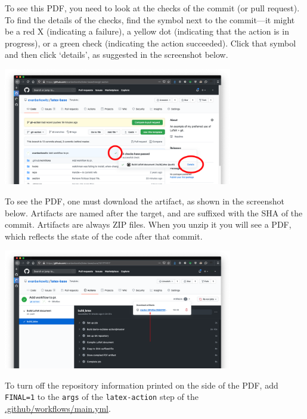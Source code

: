 To see this PDF, you need to look at the checks of the commit (or pull request).
To find the details of the checks, find the symbol next to the commit---it might be a red X (indicating a failure), a yellow dot (indicating that the action is in progress), or a green check (indicating the action succeeded).
Click that symbol and then click `details', as suggested in the screenshot below.
\begin{center}
\includegraphics[width=0.75\textwidth]{figure/github-action-find-details}
\end{center}
To see the PDF, one must download the artifact, as shown in the screenshot below.
Artifacts are named after the target, and are suffixed with the SHA of the commit.
Artifacts are always ZIP files.  When you unzip it you will see a PDF, which reflects the state of the code after that commit.
\begin{center}
\includegraphics[width=0.75\textwidth]{figure/github-action-artifact}
\end{center}
To turn off the repository information printed on the side of the PDF, add \texttt{FINAL=1} to the \texttt{args} of the \texttt{latex-action} step of the \href{https://github.com/evanberkowitz/latex-base/blob/gh-action/.github/workflows/main.yml}{.github/workflows/main.yml}.


